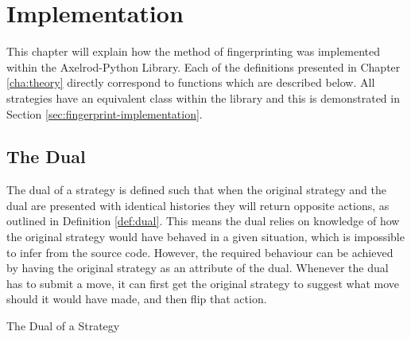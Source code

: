 
\chapter{Implementation}\label{cha:implementation}

This chapter will explain how the method of fingerprinting was implemented within the Axelrod-Python Library.
Each of the definitions presented in Chapter \ref{cha:theory} directly correspond to functions which are described below.
All strategies have an equivalent class within the library and this is demonstrated in Section \ref{sec:fingerprint-implementation}.


\section{The Dual}
The dual of a strategy is defined such that when the original strategy and the dual are presented with identical histories they will return opposite actions, as outlined in Definition \ref{def:dual}.
This means the dual relies on knowledge of how the original strategy would have
behaved in a given situation, which is impossible to infer from the source code.
However, the required behaviour can be achieved by having the original strategy as an attribute of the dual.
Whenever the dual has to submit a move, it can first get the original strategy to suggest what move should it would have made, and then flip that action.

\begin{algorithm}[H]
    \caption{The Dual of a Strategy}
\end{algorithm}

